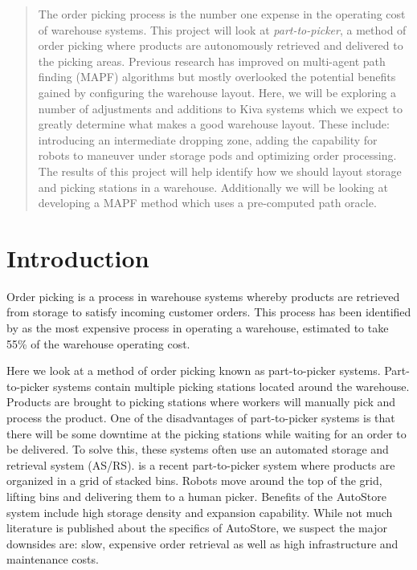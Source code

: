 \documentclass[a4paper,11pt]{article}
\begin{document}
	\begin{abstract} %
	
	\noindent The order picking process is the number one expense in the operating cost of warehouse systems. This project will look at \textit{part-to-picker}, a method of order picking where products are autonomously retrieved and delivered to the picking areas. Previous research has improved on multi-agent path finding (MAPF) algorithms but mostly overlooked the potential benefits gained by configuring the warehouse layout.
	Here, we will be exploring a number of adjustments and additions to Kiva systems which we expect to greatly determine what makes a good warehouse layout.
	These include: introducing an intermediate dropping zone, adding the capability for robots to maneuver under storage pods and optimizing order processing.
	The results of this project will help identify how we should layout storage and picking stations in a warehouse. Additionally we will be looking at developing a MAPF method which uses a pre-computed path oracle.
	
\end{abstract}
\section{Introduction}
Order picking is a process in warehouse systems whereby products are retrieved from storage to satisfy incoming customer orders. This process has been identified by \cite{de2007design} as the most expensive process in operating a warehouse, estimated to take 55\% of the warehouse operating cost.

Here we look at a method of order picking known as part-to-picker systems. Part-to-picker systems contain multiple picking stations located around the warehouse. Products are brought to picking stations where workers will manually pick and process the product. One of the disadvantages of part-to-picker systems is that there will be some downtime at the picking stations while waiting for an order to be delivered. To solve this, these systems often use an automated storage and retrieval system (AS/RS). \cite{introduction2015autostore} is a recent part-to-picker system where products are organized in a grid of stacked bins. Robots move around the top of the grid, lifting bins and delivering them to a human picker. Benefits of the AutoStore system include high storage density and expansion capability. While not much literature is published about the specifics of AutoStore, we suspect the major downsides are: slow, expensive order retrieval as well as high infrastructure and maintenance costs.
\end{document}

